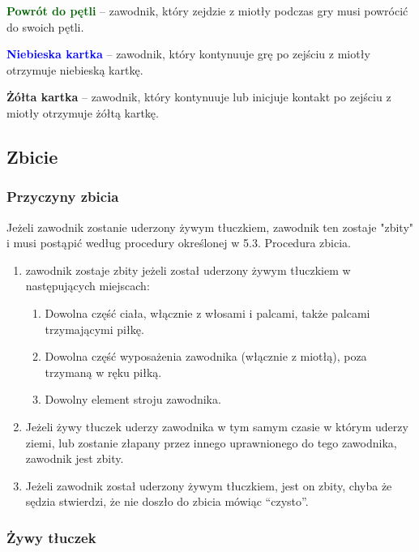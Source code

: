 \documentclass[12pt]{article}
\newcommand\yellowcard[1]{\bgroup\textcolor{darkyellow}{\textbf{#1}}}
\newcommand\bluecard[1]{\bgroup\textcolor{blue}{\textbf{#1}}}
\newcommand\other[1]{\bgroup\textcolor{darkgreen}{\textbf{#1}}}
\begin{document}
\other{Powrót do pętli} -- zawodnik, który zejdzie z miotły podczas gry
musi powrócić do swoich pętli.

\bluecard{Niebieska kartka} -- zawodnik, który kontynuuje grę po zejściu z
miotły otrzymuje niebieską kartkę.

\yellowcard{Żółta kartka} -- zawodnik, który kontynuuje lub inicjuje kontakt po
zejściu z miotły otrzymuje żółtą kartkę.

\subsection{Zbicie}

\subsubsection{Przyczyny zbicia}

Jeżeli zawodnik zostanie uderzony żywym tłuczkiem, zawodnik ten zostaje
"zbity" i musi postąpić
według procedury określonej w 5.3. Procedura zbicia.

\begin{enumerate}
	\item
	      zawodnik zostaje zbity jeżeli został uderzony żywym tłuczkiem w
	      następujących miejscach:

	      \begin{enumerate}
		      \item
		            Dowolna część ciała, włącznie z włosami i palcami, także palcami
		            trzymającymi piłkę.
		      \item
		            Dowolna część wyposażenia zawodnika (włącznie z miotłą), poza
		            trzymaną w ręku piłką.
		      \item
		            Dowolny element stroju zawodnika.
	      \end{enumerate}
	\item
	      Jeżeli żywy tłuczek uderzy zawodnika w tym samym czasie w którym
	      uderzy ziemi, lub zostanie złapany przez innego uprawnionego do tego
	      zawodnika, zawodnik jest zbity.
	\item
	      Jeżeli zawodnik został uderzony żywym tłuczkiem, jest on zbity, chyba
	      że sędzia stwierdzi, że nie doszło do zbicia mówiąc ``czysto''.
\end{enumerate}

\subsubsection{Żywy tłuczek}
\end{document}
